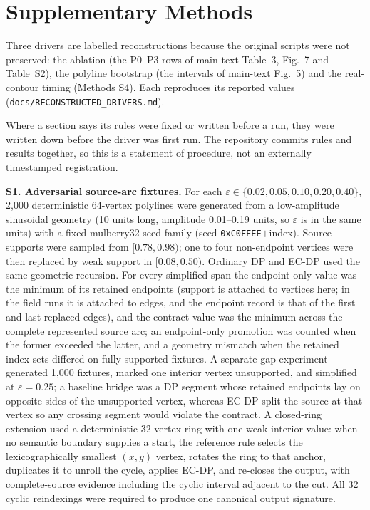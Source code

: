 \documentclass[11pt]{article}
\begin{document}
\section*{Supplementary Methods}

\noindent Three drivers are labelled reconstructions because the original scripts were not preserved: the ablation (the P0--P3 rows of main-text Table~3, Fig.~7 and Table~S2), the polyline bootstrap (the intervals of main-text Fig.~5) and the real-contour timing (Methods S4). Each reproduces its reported values (\texttt{docs/RECONSTRUCTED\_DRIVERS.md}).

\noindent Where a section says its rules were fixed or written before a run, they were written down before the driver was first run. The repository commits rules and results together, so this is a statement of procedure, not an externally timestamped registration.


\noindent\textbf{S1. Adversarial source-arc fixtures.} For each $\varepsilon\in\{0.02,0.05,0.10,0.20,0.40\}$, 2{,}000 deterministic 64-vertex polylines were generated from a low-amplitude sinusoidal geometry (10 units long, amplitude 0.01--0.19 units, so $\varepsilon$ is in the same units) with a fixed mulberry32 seed family (seed \texttt{0xC0FFEE}$+$index). Source supports were sampled from $[0.78,0.98)$; one to four non-endpoint vertices were then replaced by weak support in $[0.08,0.50)$. Ordinary DP and EC-DP used the same geometric recursion. For every simplified span the endpoint-only value was the minimum of its retained endpoints (support is attached to vertices here; in the field runs it is attached to edges, and the endpoint record is that of the first and last replaced edges), and the contract value was the minimum across the complete represented source arc; an endpoint-only promotion was counted when the former exceeded the latter, and a geometry mismatch when the retained index sets differed on fully supported fixtures. A separate gap experiment generated 1{,}000 fixtures, marked one interior vertex unsupported, and simplified at $\varepsilon=0.25$; a baseline bridge was a DP segment whose retained endpoints lay on opposite sides of the unsupported vertex, whereas EC-DP split the source at that vertex so any crossing segment would violate the contract. A closed-ring extension used a deterministic 32-vertex ring with one weak interior value: when no semantic boundary supplies a start, the reference rule selects the lexicographically smallest $(x,y)$ vertex, rotates the ring to that anchor, duplicates it to unroll the cycle, applies EC-DP, and re-closes the output, with complete-source evidence including the cyclic interval adjacent to the cut. All 32 cyclic reindexings were required to produce one canonical output signature.
\end{document}
